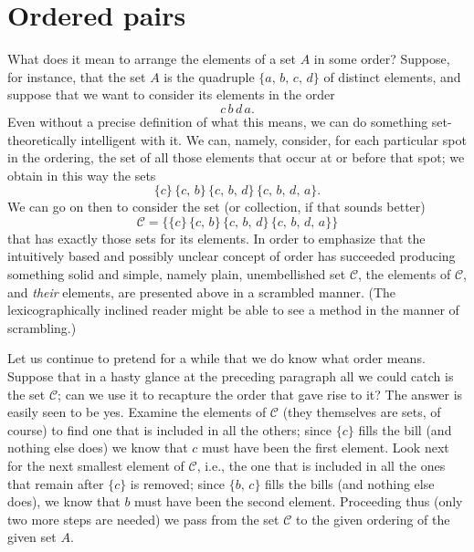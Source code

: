 \section{Ordered pairs}

What does it mean to arrange the elements of a set $A$ in some order? Suppose, for instance, that the set $A$ is the quadruple $\{a, \, b, \, c, \, d\}$ of distinct elements, and suppose that we want to consider its elements in the order
\[
	c \, b \, d \, a.
\]
Even without a precise definition of what this means, we can do something set-theoretically intelligent with it. We can, namely, consider, for each particular spot in the ordering, the set of all those elements that occur at or before that spot; we obtain in this way the sets
\[
	\{c\} \, \{c, \, b\} \, \{c, \, b, \, d\} \, \{c, \, b, \, d, \, a\}.
\]
We can go on then to consider the set (or collection, if that sounds better)
\[
	\mathcal{C} = \{ \{c\} \, \{c, \, b\} \, \{c, \, b, \, d\} \, \{c, \, b, \, d, \, a\}\}
\]
that has exactly those sets for its elements. In order to emphasize that the intuitively based and possibly unclear concept of order has succeeded producing something solid and simple, namely plain, unembellished set $\mathcal{C}$, the elements of $\mathcal{C}$, and \textit{their} elements, are presented above in a scrambled manner. (The lexicographically inclined reader might be able to see a method in the manner of scrambling.)

Let us continue to pretend for a while that we do know what order means. Suppose that in a hasty glance at the preceding paragraph all we could catch is the set $\mathcal{C}$; can we use it to recapture the order that gave rise to it? The answer is easily seen to be yes. Examine the elements of $\mathcal{C}$ (they themselves are sets, of course) to find one that is included in all the others; since $\{c\}$ fills the bill (and nothing else does) we know that $c$ must have been the first element. Look next for the next smallest element of $\mathcal{C}$, i.e., the one that is included in all the ones that remain after $\{c\}$ is removed; since $\{b, \, c\}$ fills the bills (and nothing else does), we know that $b$ must have been the second element. Proceeding thus (only two more steps are needed) we pass from the set $\mathcal{C}$ to the given ordering of the given set $A$.

